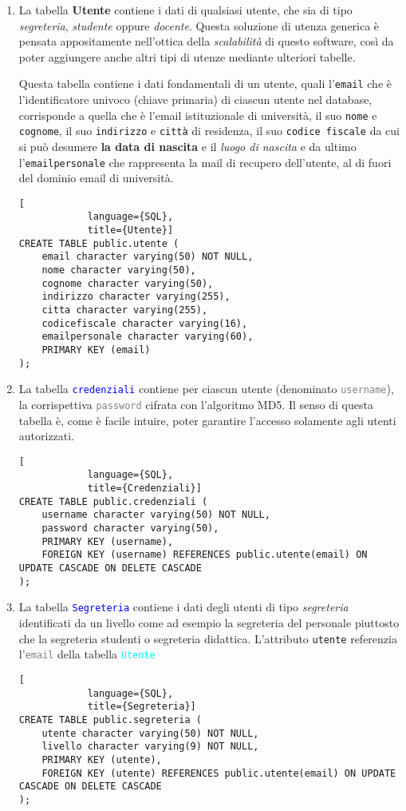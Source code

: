\documentclass{article}
\newcommand{\tabb}[1]{\texttt{\textcolor{blue}{#1}}}
\newcommand{\tab}[1]{\texttt{\textcolor{cyan}{#1}}}
\newcommand{\attr}[1]{\texttt{\textcolor{gray}{#1}}}
\begin{document}
    \begin{enumerate}
        \item La tabella \textbf{Utente} contiene i dati di qualsiasi utente, che sia di tipo \emph{segreteria}, \emph{studente} oppure \emph{docente}. Questa soluzione di utenza generica è pensata appositamente nell'ottica della \emph{scalabilità} di questo software, così da poter aggiungere anche altri tipi di utenze mediante ulteriori tabelle.

        Questa tabella contiene i dati fondamentali di un utente, quali l'\texttt{email} che è l'identificatore univoco (chiave primaria) di ciascun utente nel database, corrisponde a quella che è l'email istituzionale di università, il suo \texttt{nome} e \texttt{cognome}, il suo \texttt{indirizzo} e \texttt{città} di residenza, il suo \texttt{codice fiscale} da cui si può desumere \textbf{la data di nascita} e il \textit{luogo di nascita} e da ultimo l'\texttt{emailpersonale} che rappresenta la mail di recupero dell'utente, al di fuori del dominio email di università.
        \begin{lstlisting}[
            language={SQL},
            title={Utente}]
CREATE TABLE public.utente (
    email character varying(50) NOT NULL,
    nome character varying(50),
    cognome character varying(50),
    indirizzo character varying(255),
    citta character varying(255),
    codicefiscale character varying(16),
    emailpersonale character varying(60),
    PRIMARY KEY (email)
);
        \end{lstlisting}

        \item La tabella \tabb{credenziali} contiene per ciascun utente (denominato \attr{username}), la corrispettiva \attr{password} cifrata con l'algoritmo MD5. Il senso di questa tabella è, come è facile intuire, poter garantire l'accesso solamente agli utenti autorizzati.
        \begin{lstlisting}[
            language={SQL},
            title={Credenziali}]
CREATE TABLE public.credenziali (
    username character varying(50) NOT NULL,
    password character varying(50),
    PRIMARY KEY (username),
    FOREIGN KEY (username) REFERENCES public.utente(email) ON UPDATE CASCADE ON DELETE CASCADE
);
        \end{lstlisting}

        \item La tabella \tabb{Segreteria} contiene i dati degli utenti di tipo \textit{segreteria} identificati da un livello come ad esempio la segreteria del personale piuttosto che la segreteria studenti o segreteria didattica. L'attributo \texttt{utente} referenzia l'\attr{email} della tabella \tab{Utente}
        \begin{lstlisting}[
            language={SQL},
            title={Segreteria}]
CREATE TABLE public.segreteria (
    utente character varying(50) NOT NULL,
    livello character varying(9) NOT NULL,
    PRIMARY KEY (utente),
    FOREIGN KEY (utente) REFERENCES public.utente(email) ON UPDATE CASCADE ON DELETE CASCADE
);
        \end{lstlisting}


\end{enumerate}
\end{document}
